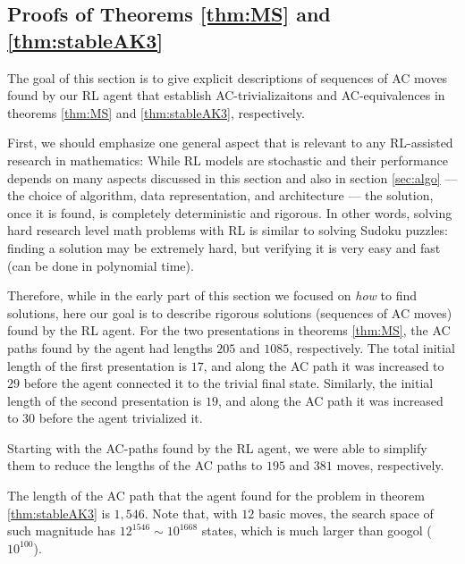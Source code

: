 \subsection{Proofs of Theorems \ref{thm:MS} and \ref{thm:stableAK3}}
\label{sec:RLsolutions}

The goal of this section is to give explicit descriptions of sequences of AC moves found by our RL agent that establish AC-trivializaitons and AC-equivalences in theorems \ref{thm:MS} and \ref{thm:stableAK3}, respectively.

First, we should emphasize one general aspect that is relevant to any RL-assisted research in mathematics: While RL models are stochastic and their performance depends on many aspects discussed in this section and also in section \ref{sec:algo} --- the choice of algorithm, data representation, and architecture --- the solution, once it is found, is completely deterministic and rigorous. In other words, solving hard research level math problems with RL is similar to solving Sudoku puzzles: finding a solution may be extremely hard, but verifying it is very easy and fast (can be done in polynomial time).

Therefore, while in the early part of this section we focused on {\it how} to find solutions, here our goal is to describe rigorous solutions (sequences of AC moves) found by the RL agent.
%
For the two presentations in theorems \ref{thm:MS}, the AC paths found by the agent had lengths $205$ and $1085$, respectively. The total initial length of the first presentation is $17$, and along the AC path it was increased to $29$ before the agent connected it to the trivial final state. Similarly, the initial length of the second presentation is $19$, and along the AC path it was increased to $30$ before the agent trivialized it.

Starting with the AC-paths found by the RL agent, we were able to simplify them to reduce the lengths of the AC paths to $195$ and $381$ moves, respectively.

The length of the AC path that the agent found for the problem in theorem \ref{thm:stableAK3} is $1,546$. Note that, with $12$ basic moves, the search space of such magnitude has $12^{1546} \sim 10^{1668}$ states, which is much larger than googol ($10^{100}$).